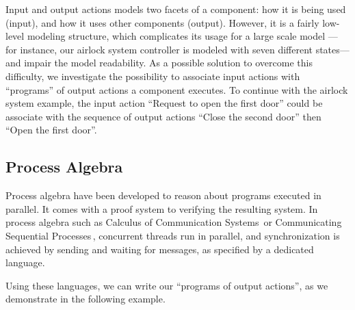 Input and output actions models two facets of a component: how it is being used
(input), and how it uses other components (output).
%
However, it is a fairly low-level modeling structure, which complicates its
usage for a large scale model --- for instance, our airlock system controller is
modeled with seven different states--- and impair the model readability.
%
As a possible solution to overcome this difficulty, we investigate the
possibility to associate input actions with ``programs'' of output actions a
component executes.
%
To continue with the airlock system example, the input action ``Request to open
the first door'' could be associate with the sequence of output actions ``Close
the second door'' then ``Open the first door''. 

\subsection{Process Algebra}
\label{subsec:sota:palgebra}

Process algebra have been developed to reason about programs executed in
parallel. It comes with a proof system to verifying the resulting
system. 
%
In process algebra such as Calculus of Communication
Systems\,\cite{milner1980ccs} or Communicating Sequential
Processes\,\cite{hoare1978csp}, concurrent threads run in parallel, and
synchronization is achieved by sending and waiting for messages, as specified by
a dedicated language.

Using these languages, we can write our ``programs of output actions'', as we
demonstrate in the following example.

